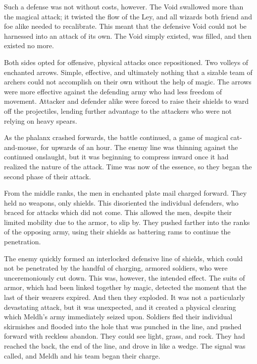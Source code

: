 Such a defense was not without costs, however. The Void swallowed more than the magical attack; it twisted the flow of the Ley, and all wizards both friend and foe alike needed to recalibrate. This meant that the defensive Void could not be harnessed into an attack of its own. The Void simply existed, was filled, and then existed no more.

Both sides opted for offensive, physical attacks once repositioned. Two volleys of enchanted arrows. Simple, effective, and ultimately nothing that a sizable team of archers could not accomplish on their own without the help of magic. The arrows were more effective against the defending army who had less freedom of movement. Attacker and defender alike were forced to raise their shields to ward off the projectiles, lending further advantage to the attackers who were not relying on heavy spears.

As the phalanx crashed forwards, the battle continued, a game of magical cat-and-mouse, for upwards of an hour. The enemy line was thinning against the continued onslaught, but it was beginning to compress inward once it had realized the nature of the attack. Time was now of the essence, so they began the second phase of their attack.

From the middle ranks, the men in enchanted plate mail charged forward. They held no weapons, only shields. This disoriented the individual defenders, who braced for attacks which did not come. This allowed the men, despite their limited mobility due to the armor, to slip by. They pushed farther into the ranks of the opposing army, using their shields as battering rams to continue the penetration.

The enemy quickly formed an interlocked defensive line of shields, which could not be penetrated by the handful of charging, armored soldiers, who were unceremoniously cut down. This was, however, the intended effect. The suits of armor, which had been linked together by magic, detected the moment that the last of their wearers expired.
\SmallVSpace
And then they exploded.
\SmallVSpace
It was not a particularly devastating attack, but it was unexpected, and it created a physical clearing which Meldh’s army immediately seized upon. Soldiers fled their individual skirmishes and flooded into the hole that was punched in the line, and pushed forward with reckless abandon. They could see light, grass, and rock. They had reached the back, the end of the line, and drove in like a wedge. The signal was called, and Meldh and his team began their charge.

